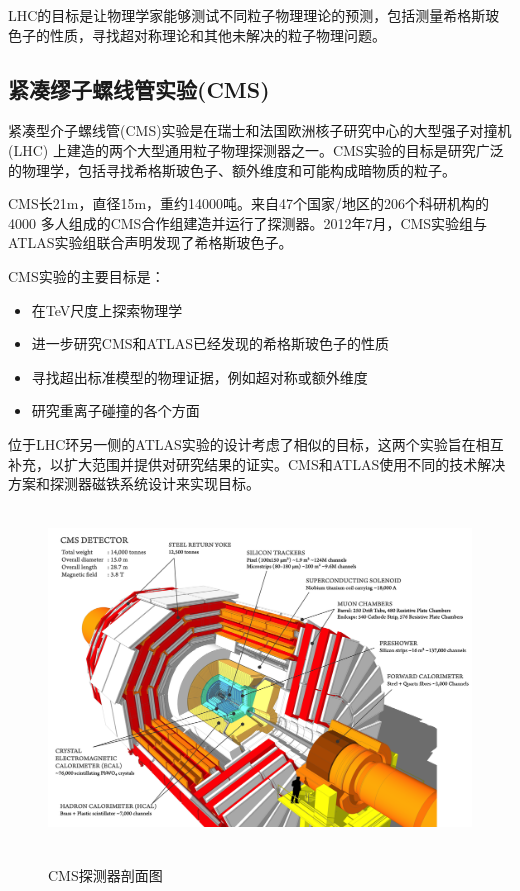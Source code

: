 LHC的目标是让物理学家能够测试不同粒子物理理论的预测，包括测量希格斯玻色子的性质，寻找超对称理论和其他未解决的粒子物理问题。

\subsection{紧凑缪子螺线管实验(CMS)}
紧凑型介子螺线管(CMS)实验是在瑞士和法国欧洲核子研究中心的大型强子对撞机(LHC) 上建造的两个大型通用粒子物理探测器之一。CMS实验的目标是研究广泛的物理学，包括寻找希格斯玻色子、额外维度和可能构成暗物质的粒子。

CMS长21m，直径15m，重约14000吨。来自47个国家/地区的206个科研机构的4000 多人组成的CMS合作组建造并运行了探测器。2012年7月，CMS实验组与ATLAS实验组联合声明发现了希格斯玻色子。

CMS实验的主要目标是：
\begin{itemize}
    \item 在TeV尺度上探索物理学
    \item 进一步研究CMS和ATLAS已经发现的希格斯玻色子的性质
    \item 寻找超出标准模型的物理证据，例如超对称或额外维度
    \item 研究重离子碰撞的各个方面
\end{itemize}

位于LHC环另一侧的ATLAS实验的设计考虑了相似的目标，这两个实验旨在相互补充，以扩大范围并提供对研究结果的证实。CMS和ATLAS使用不同的技术解决方案和探测器磁铁系统设计来实现目标。

\begin{figure}[H]
 \centering
 \caption{CMS探测器剖面图\cite{cms-detector}}
 \includegraphics[height=9cm, width=13cm]{pictures/CMS_detector.png}
 \label{fig:1.5}
\end{figure}

